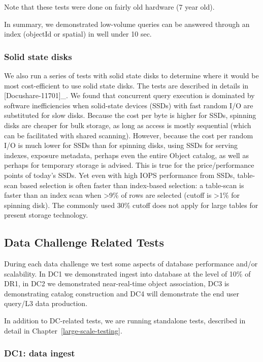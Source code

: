 \documentclass[DM,lsstdraft,toc]{lsstdoc}
\begin{document}
Note that these tests were done on fairly old hardware (7 year old).

In summary, we demonstrated low-volume queries can be answered through
an index (objectId or spatial) in well under 10 sec.

\subsubsection{Solid state disks}\label{solid-state-disks}

We also run a series of tests with solid state disks to determine where
it would be most cost-efficient to use solid state disks. The tests are
described in details in {[}Docushare-11701{]}\_. We found that
concurrent query execution is dominated by software inefficiencies when
solid-state devices (SSDs) with fast random I/O are substituted for slow
disks. Because the cost per byte is higher for SSDs, spinning disks are
cheaper for bulk storage, as long as access is mostly sequential (which
can be facilitated with shared scanning). However, because the cost per
random I/O is much lower for SSDs than for spinning disks, using SSDs
for serving indexes, exposure metadata, perhaps even the entire Object
catalog, as well as perhaps for temporary storage is advised. This is
true for the price/performance points of today's SSDs. Yet even with
high IOPS performance from SSDs, table-scan based selection is often
faster than index-based selection: a table-scan is faster than an index
scan when \textgreater{}9\% of rows are selected (cutoff is
\textgreater{}1\% for spinning disk). The commonly used 30\% cutoff does
not apply for large tables for present storage technology.

\subsection{Data Challenge Related
Tests}\label{data-challenge-related-tests}

During each data challenge we test some aspects of database performance
and/or scalability. In DC1 we demonstrated ingest into database at the
level of 10\% of DR1, in DC2 we demonstrated near-real-time object
association, DC3 is demonstrating catalog construction and DC4 will
demonstrate the end user query/L3 data production.

In addition to DC-related tests, we are running standalone tests,
described in detail in Chapter~\ref{large-scale-testing}.

\subsubsection{DC1: data ingest}\label{dc1-data-ingest}
\end{document}
